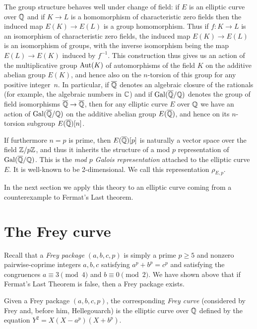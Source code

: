 The group structure behaves well under change of field: if $E$ is an elliptic curve over $\mathbb{Q}$
and if $K\to L$ is a homomorphism of
characteristic zero fields then the induced map $E(K)\to E(L)$ is a group homomorphism.
Thus if $f:K\to L$ is an isomorphism of characteristic zero fields, the induced map $E(K)\to E(L)$
is an isomorphism of groups, with the inverse isomorphism being the map $E(L)\to E(K)$ induced
by $f^{-1}$. This construction thus gives us an action of the multiplicative group $\operatorname{Aut}(K)$
of automorphisms of the field $K$ on the additive abelian group $E(K)$, and hence also
on the $n$-torsion of this group for any positive integer~$n$.
In particular, if $\overline{\mathbb{Q}}$ denotes an algebraic closure of the
rationals (for example, the algebraic numbers in $\mathbb{C}$) and if $\operatorname{Gal}(\overline{\mathbb{Q}}/\mathbb{Q})$ denotes the group of field
isomorphisms $\overline{\mathbb{Q}}\to\overline{\mathbb{Q}}$, then for any elliptic curve $E$ over $\mathbb{Q}$ we have an action
of $\operatorname{Gal}(\overline{\mathbb{Q}}/\mathbb{Q})$ on the additive abelian group $E(\overline{\mathbb{Q}})$, and hence on its $n$-torsion subgroup
$E(\overline{\mathbb{Q}})[n]$.

If furthermore $n=p$ is prime, then $E(\overline{\mathbb{Q}})[p]$ is naturally a vector space over the
field $\mathbb{Z}/p\mathbb{Z}$, and thus it inherits the structure of a mod $p$ representation of $\operatorname{Gal}(\overline{\mathbb{Q}}/\mathbb{Q})$.
This is the \emph{mod $p$ Galois representation} attached to the elliptic curve $E$.
It is well-known to be 2-dimensional. We call this representation $\rho_{E,p}$.

In the next section we apply this theory to an elliptic curve coming from a counterexample to
Fermat's Last theorem.

\section{The Frey curve}

Recall that a \emph{Frey package} $(a,b,c,p)$ is simply a prime $p\geq5$ and nonzero
pairwise-coprime integers $a,b,c$ satisfying $a^p+b^p=c^p$ and satisfying the congruences
$a\equiv3\pmod4$ and $b\equiv0\pmod2$. We have shown above that if Fermat's Last Theorem is false,
then a Frey package exists.

\begin{definition}[Frey]
  \label{FreyCurve}
  \leanok
  Given a Frey package $(a,b,c,p)$, the corresponding \emph{Frey curve} (considered by Frey and,
  before him, Hellegouarch) is the elliptic curve over $\mathbb{Q}$ defined by the equation
  $Y^2=X(X-a^p)(X+b^p).$
\end{definition}

